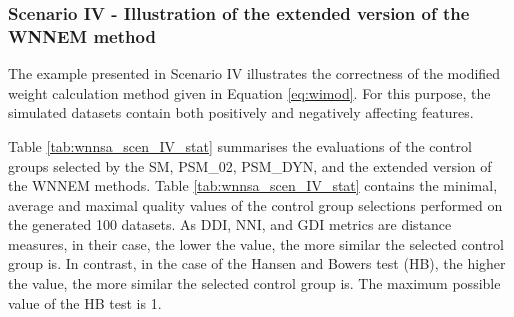 		\subsubsection{Scenario IV - Illustration of the extended version of the WNNEM method}
		\label{sec:wnnsa_eval_scen_IV}
										
		The example presented in Scenario IV illustrates the correctness of the modified weight calculation method given in Equation \ref{eq:wimod}. For this purpose, the simulated datasets contain both positively and negatively affecting features. 
										
		Table \ref{tab:wnnsa_scen_IV_stat} summarises the evaluations of the control groups selected by the SM, PSM\_02, PSM\_DYN, and the extended version of the WNNEM methods. Table \ref{tab:wnnsa_scen_IV_stat} contains the minimal, average and maximal quality values of the control group selections performed on the generated 100 datasets. As DDI, NNI, and GDI metrics are distance measures, in their case, the lower the value, the more similar the selected control group is. In contrast, in the case of the Hansen and Bowers test (HB), the higher the value, the more similar the selected control group is. The maximum possible value of the HB test is 1. 
										
